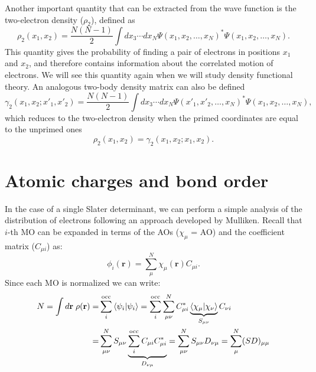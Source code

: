 \documentclass[../Main/chem532-notes.tex]{subfiles}
\begin{document}
Another important quantity that can be extracted from the wave function is the two-electron density ($\rho_2$), defined as
\begin{equation}
\rho_2(x_1,x_2) = \frac{N(N-1)}{2} \int dx_3 \cdots dx_N \Psi(x_1,x_2,\ldots,x_N)^* \Psi(x_1,x_2,\ldots,x_N).
\end{equation}
This quantity gives the probability of finding a pair of electrons in positions $x_1$ and $x_2$, and therefore contains information about the correlated motion of electrons.
We will see this quantity again when we will study density functional theory.
An analogous two-body density matrix can also be defined
\begin{equation}
\gamma_2(x_1,x_2; x'_1,x'_2) = \frac{N(N-1)}{2} \int dx_3 \cdots dx_N \Psi(x'_1,x'_2,\ldots,x_N)^* \Psi(x_1,x_2,\ldots,x_N),
\end{equation}
which reduces to the two-electron density when the primed coordinates are equal to the unprimed ones
\begin{equation}
\rho_2(x_1,x_2) = \gamma_2(x_1,x_2; x_1,x_2).
\end{equation}


\section{Atomic charges and bond order}

In the case of a single Slater determinant, we can perform a simple analysis of the distribution of electrons following an approach developed by Mulliken.
Recall that $i$-th MO can be expanded in terms of the AOs ($\chi_\mu$ = AO) and the coefficient matrix ($C_{\mu i}$) as:
\begin{equation}
\phi_i(\mathbf{r}) = \sum_\mu^{N} \chi_\mu(\mathbf{r}) C_{\mu i}.
\end{equation}
Since each MO is normalized we can write:
\begin{equation}
\begin{split}
N =\int d\mathbf{r} \; \rho(\mathbf{r}) =  & \sum_i^{\mathrm{occ}} \braket{\psi_i | \psi_i} = 
\sum_i^{\mathrm{occ}} \sum_{\mu \nu}^N C_{\mu i}^*  \underbrace{\braket{\chi_\mu | \chi_\nu}}_{S_{\mu\nu}} C_{\nu i} \\
= & \sum_{\mu \nu}^N  S_{\mu\nu} \underbrace{\sum_i^{\mathrm{occ}}  C_{\mu i} C_{\mu i}^*}_{D_{\nu\mu}} 
= \sum_{\mu \nu}^N  S_{\mu\nu} D_{\nu\mu} = \sum_{\mu}^N  (SD)_{\mu\mu}
\end{split}
\end{equation}
\end{document}
